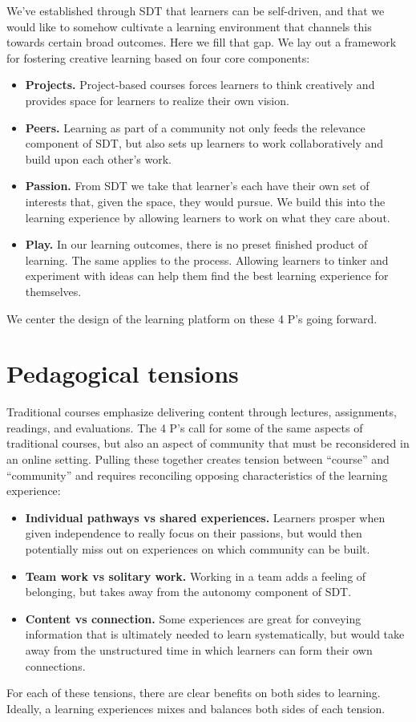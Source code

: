 \documentclass[12pt,twoside,vi]{mitthesis}
\begin{document}
We've established through SDT that learners can be self-driven, and that we would like to somehow cultivate a learning environment that channels this towards certain broad outcomes. Here we fill that gap. We lay out a framework for fostering creative learning based on four core components:
\begin{itemize}
\item \textbf{Projects.} Project-based courses forces learners to think creatively and provides space for learners to realize their own vision.
\item \textbf{Peers.} Learning as part of a community not only feeds the relevance component of SDT, but also sets up learners to work collaboratively and build upon each other's work.
\item \textbf{Passion.} From SDT we take that learner's each have their own set of interests that, given the space, they would pursue. We build this into the learning experience by allowing learners to work on what they care about.
\item \textbf{Play.} In our learning outcomes, there is no preset finished product of learning. The same applies to the process. Allowing learners to tinker and experiment with ideas can help them find the best learning experience for themselves.~\cite{cultivating}\cite{resnick2014give}\cite{creativelearningfuturework}
\end{itemize}
We center the design of the learning platform on these 4 P's going forward. 

\section{Pedagogical tensions}

Traditional courses emphasize delivering content through lectures, assignments, readings, and evaluations. The 4 P's call for some of the same aspects of traditional courses, but also an aspect of community that must be reconsidered in an online setting. Pulling these together creates tension between ``course'' and ``community'' and requires reconciling opposing characteristics of the learning experience:
\begin{itemize}
	\item \textbf{Individual pathways vs shared experiences.} Learners prosper when given independence to really focus on their passions, but would then potentially miss out on experiences on which community can be built. 
	\item \textbf{Team work vs solitary work.} Working in a team adds a feeling of belonging, but takes away from the autonomy component of SDT.
	\item \textbf{Content vs connection.} Some experiences are great for conveying information that is ultimately needed to learn systematically, but would take away from the unstructured time in which learners can form their own connections.
\end{itemize} 
For each of these tensions, there are clear benefits on both sides to learning. Ideally, a learning experiences mixes and balances both sides of each tension.\cite{learningcreativelearning} 
\end{document}
